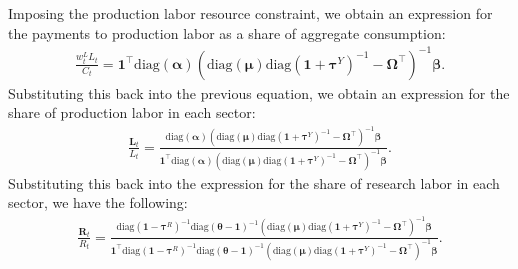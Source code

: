 \documentclass[12pt]{article}
\begin{document}
Imposing the production labor resource constraint, we obtain an expression for the payments to production labor as a share of aggregate consumption:
\begin{align*}
\frac{w_t^L L_t}{C_t} = \mathbf{1}^{\top} \text{diag}(\bm{\alpha}) (\text{diag}(\bm{\mu}) \text{diag}(\mathbf{1} + \bm{\tau}^Y)^{-1} - \bm{\Omega}^{\top})^{-1} \bm{\beta}.
\end{align*}
Substituting this back into the previous equation, we obtain an expression for the share of production labor in each sector:
\begin{align*}
\frac{\mathbf{L}_t}{L_t} = \frac{\text{diag}(\bm{\alpha}) (\text{diag}(\bm{\mu}) \text{diag}(\mathbf{1} + \bm{\tau}^Y)^{-1} - \bm{\Omega}^{\top})^{-1} \bm{\beta}}{\mathbf{1}^{\top} \text{diag}(\bm{\alpha}) (\text{diag}(\bm{\mu}) \text{diag}(\mathbf{1} + \bm{\tau}^Y)^{-1} - \bm{\Omega}^{\top})^{-1} \bm{\beta}}.
\end{align*}
Substituting this back into the expression for the share of research labor in each sector, we have the following:
\begin{align*}
\frac{\mathbf{R}_t}{R_t} = \frac{\text{diag}(\mathbf{1} - \bm{\tau}^R)^{-1} \text{diag}(\bm{\theta} - \mathbf{1})^{-1} (\text{diag}(\bm{\mu}) \text{diag}(\mathbf{1} + \bm{\tau}^Y)^{-1} - \bm{\Omega}^{\top})^{-1} \bm{\beta}}{\mathbf{1}^{\top} \text{diag}(\mathbf{1} - \bm{\tau}^R)^{-1} \text{diag}(\bm{\theta} - \mathbf{1})^{-1} (\text{diag}(\bm{\mu}) \text{diag}(\mathbf{1} + \bm{\tau}^Y)^{-1} - \bm{\Omega}^{\top})^{-1} \bm{\beta}}.
\end{align*}
\end{document}

